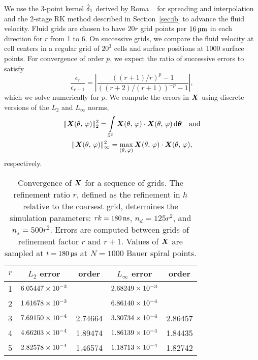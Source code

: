We use the 3-point kernel $\hat{\delta}_1$ derived by Roma ~\cite{Roma:1999tx} for
spreading and interpolation and the 2-stage RK method described in Section~\ref{sec:ib}
to advance the fluid velocity. Fluid grids are chosen to have $20r$ grid points per
$16\um$ in each direction for $r$ from 1 to 6. On successive grids, we compare the fluid
velocity at cell centers in a regular grid of $20^3$ cells and surface positions at 1000
surface points. For convergence of order $p$, we expect the ratio of successive errors to
satisfy
\begin{equation*}
    \frac{\epsilon_r}{\epsilon_{r+1}} = \left|\frac{((r+1)/r)^p-1}{((r+2)/(r+1))^{-p}-1}\right|,
\end{equation*}
which we solve numerically for $p$. We compute the errors in $\boldsymbol{X}$ using discrete versions
of the $L_2$ and $L_\infty$ norms,
\begin{gather}
    \|\X(\theta,\,\varphi)\|_2^2 =
    \int\limits_{\sphere} \X(\theta,\,\varphi)\cdot\X(\theta,\,\varphi) \d\qs \quad\text{and} \\
    \|\X(\theta,\,\varphi)\|_\infty^2 =
    \max_{(\theta,\,\varphi)} \X(\theta,\,\varphi)\cdot\X(\theta,\,\varphi),
\end{gather}
respectively.

\begin{table}[t!]
    \centering
    \caption[Convergence of surface positions for relaxing RBC test]{%
Convergence of $\boldsymbol{X}$ for a sequence of grids. The refinement ratio $r$, defined as the
refinement in $h$ relative to the coarsest grid, determines the simulation parameters:
$r\timestep = 180\ns$, $n_d = 125r^2$, and $n_s = 500r^2$. Errors are computed between
grids of refinement factor $r$ and $r+1$. Values of $\boldsymbol{X}$ are sampled at $t = 180\us$ at
$N=1000$ Bauer spiral points.
    }\label{tab:x-rbc-conv}
    \begingroup
    \setlength{\tabcolsep}{9pt}
    \renewcommand{\arraystretch}{1.5}
    \begin{tabular}{c|cc|cc}
                                                                                     \toprule
        $r$ & $L_2$ error            & order   & $L_\infty$ error       & order   \\ \midrule
        1   & ${6.05447}\times 10^{-3}$ &         & ${2.68249}\times 10^{-3}$ &         \\
        2   & ${1.61678}\times 10^{-3}$ &         & ${6.86140}\times 10^{-4}$ &         \\
        3   & ${7.69150}\times 10^{-4}$ & 2.74664 & ${3.30734}\times 10^{-4}$ & 2.86457 \\
        4   & ${4.66203}\times 10^{-4}$ & 1.89474 & ${1.86139}\times 10^{-4}$ & 1.84435 \\
        5   & ${2.82578}\times 10^{-4}$ & 1.46574 & ${1.18713}\times 10^{-4}$ & 1.82742 \\ \bottomrule
    \end{tabular}
    \endgroup
\end{table}

